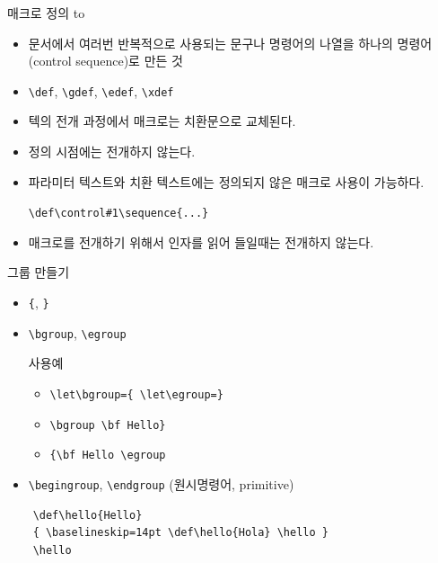\documentclass{beamer}
\begin{document}
%
\begin{frame}[fragile]{매크로 정의}
  \medskip
  \hbox to
  \smallskip
  \begin{itemize}
  \item 문서에서 여러번 반복적으로 사용되는 문구나 명령어의 나열을 하나의
    명령어(control sequence)로 만든 것
  \item \verb+\def+, \verb+\gdef+, \verb+\edef+, \verb+\xdef+
  \item 텍의 전개 과정에서 매크로는 치환문으로 교체된다.
  \item 정의 시점에는 전개하지 않는다.
  \item 파라미터 텍스트와 치환 텍스트에는 정의되지 않은 매크로 사용이 가능하다.
    
    \verb+\def\control#1\sequence{...}+
  \item 매크로를 전개하기 위해서 인자를 읽어 들일때는 전개하지 않는다.
  \end{itemize}
\end{frame}


%
\begin{frame}[fragile]{그룹 만들기}
  \begin{itemize}
  \item \verb+{+, \verb+}+
  \item \verb+\bgroup+, \verb+\egroup+
    \begin{exampleblock}{사용예}
      \begin{itemize}
      \item \verb+\let\bgroup={ \let\egroup=}+
      \item \verb+\bgroup \bf Hello}+
      \item \verb+{\bf Hello \egroup+
      \end{itemize}
    \end{exampleblock}
  \item \verb+\begingroup+, \verb+\endgroup+ (원시명령어, primitive)
  \end{itemize}

  {\small
  \begin{verbatim}
    \def\hello{Hello}
    { \baselineskip=14pt \def\hello{Hola} \hello }
    \hello
  \end{verbatim}}
\end{frame}


%
\end{document}

